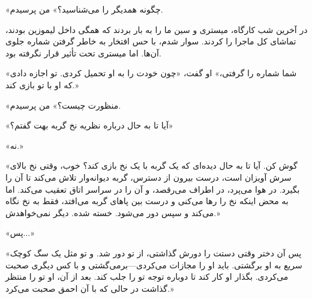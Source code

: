 «چگونه همدیگر را می‌شناسید؟» من پرسیدم.

در آخرین شب کارگاه، میستری و سین ما را به بار بردند که همگی داخل لیموزین بودند، تماشای کل ماجرا را کردند. سوار شدم، با حس افتخار به خاطر گرفتن شماره جلوی آن‌ها. اما میستری تحت تأثیر قرار نگرفته بود.

«شما شماره را گرفتی،» او گفت، «چون خودت را به او تحمیل کردی. تو اجازه دادی که او با تو بازی کند.»

«منظورت چیست؟» من پرسیدم.

«آیا تا به حال درباره نظریه نخ گربه بهت گفتم؟»

«نه.»

«گوش کن. آیا تا به حال دیده‌ای که یک گربه با یک نخ بازی کند؟ خوب، وقتی نخ بالای سرش آویزان است، درست بیرون از دسترس، گربه دیوانه‌وار تلاش می‌کند تا آن را بگیرد. در هوا می‌پرد، در اطراف می‌رقصد، و آن را در سراسر اتاق تعقیب می‌کند. اما به محض اینکه نخ را رها می‌کنی و درست بین پاهای گربه می‌افتد، فقط به نخ نگاه می‌کند و سپس دور می‌شود. خسته شده. دیگر نمی‌خواهدش.»

«پس...»

«پس آن دختر وقتی دستت را دورش گذاشتی، از تو دور شد. و تو مثل یک سگ کوچک سریع به او برگشتی. باید او را مجازات می‌کردی—برمی‌گشتی و با کس دیگری صحبت می‌کردی. بگذار او کار کند تا دوباره توجه تو را جلب کند. بعد از آن، او تو را منتظر گذاشت در حالی که با آن احمق صحبت می‌کرد.»